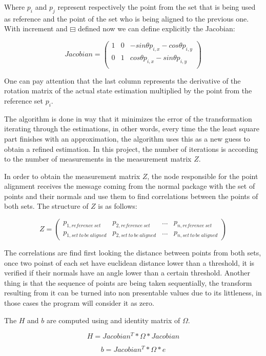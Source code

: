 \documentclass[10pt,a4paper,final]{report}
\begin{document}
Where $p_{i}$ and $p_{j}$ represent respectively the point from the set that is being used as reference and the point of the set who is being aligned to the previous one. With increment and $\boxminus$ defined now we can define explicitly the Jacobian:

\begin{equation}
Jacobian = \begin{pmatrix}
1 & 0 & -sin\theta p_{i, x} - cos\theta p_{i, y}\\
0 & 1 & cos\theta p_{i, x} - sin\theta p_{i, y}\\
\end{pmatrix}
\end{equation}

One can pay attention that the last column represents the derivative of the rotation matrix of the actual state estimation multiplied by the point from the reference set $p_{i}$.

The algorithm is done in way that it minimizes the error of the transformation iterating through the estimations, in other words, every time the the least square part finishes with an approximation, the algorithm uses this as a new guess to obtain a refined estimation. In this project, the number of iterations is according to the number of measurements in the measurement matrix $Z$.

In order to obtain the measurement matrix $Z$, the node responsible for the point alignment receives the message coming from the normal package with the set of points and their normals and use them to find correlations between the points of both sets. The structure of $Z$ is as follows:

\begin{equation}
Z = \begin{pmatrix}
p_{1, reference \ set} & p_{2, reference \ set} & ... & p_{n, reference \ set} \\
p_{1, set\ to \ be \ aligned} & p_{2, set\ to \ be \ aligned} & ... & p_{n, set\ to \ be \ aligned}
\end{pmatrix}
\end{equation}

The correlations are find first looking the distance between points from both sets, once two poinst of each set have euclidean distance lower than a threshold, it is verified if their normals have an angle lower than a certain threshold. Another thing is that the sequence of points are being taken sequentially, the transform resulting from it can be turned into non presentable values due to its littleness, in those cases the program will consider it as zero.

The $H$ and $b$ are computed using and identity matrix of $\Omega$.

\begin{equation}
H = Jacobian^T*\Omega*Jacobian
\end{equation}

\begin{equation}
b = Jacobian^T*\Omega*e
\end{equation}
\end{document}
